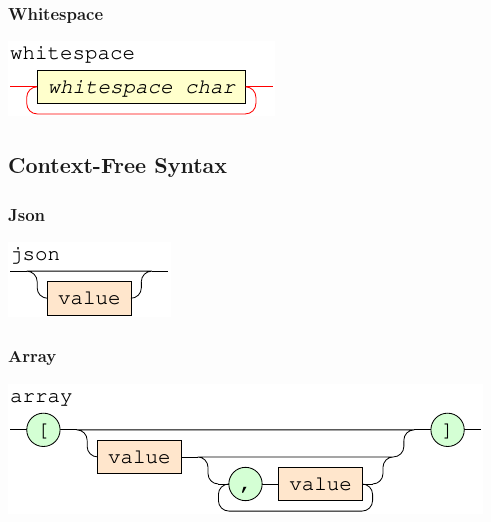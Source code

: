 \documentclass[a4paper]{article}
\begin{document}
\subsubsection{Whitespace}


{\centering

   \includegraphics[scale=0.9]{syntax/Lexical/whitespace}

}
\newpage

\subsection{Context-Free Syntax}

\subsubsection{Json}


{\centering

   \includegraphics[scale=0.9]{syntax/ContextFree/json}

}

\subsubsection{Array}


{\centering

   \includegraphics[scale=0.9]{syntax/ContextFree/array}

}
\end{document}
